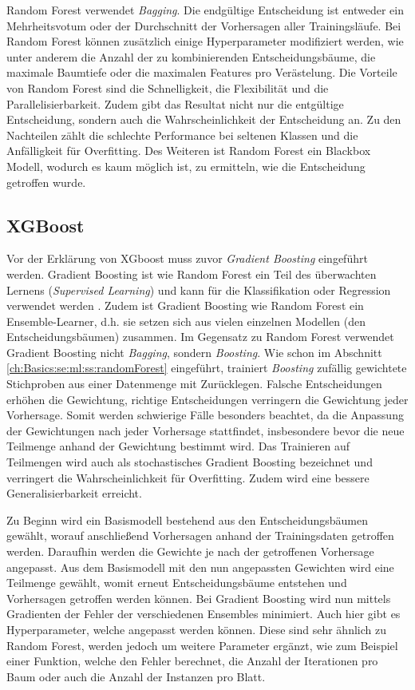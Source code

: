 Random Forest verwendet \textit{Bagging}. 
Die endgültige Entscheidung ist entweder ein Mehrheitsvotum oder der Durchschnitt der Vorhersagen aller Trainingsläufe.
Bei Random Forest können zusätzlich einige Hyperparameter modifiziert werden, wie unter anderem die Anzahl der zu kombinierenden Entscheidungsbäume, die maximale Baumtiefe oder die maximalen Features pro Verästelung. 
Die Vorteile von Random Forest sind die Schnelligkeit, die Flexibilität und die Parallelisierbarkeit.
Zudem gibt das Resultat nicht nur die entgültige Entscheidung, sondern auch die Wahrscheinlichkeit der Entscheidung an.
Zu den Nachteilen zählt die schlechte Performance bei seltenen Klassen und die Anfälligkeit für Overfitting.
Des Weiteren ist Random Forest ein Blackbox Modell, wodurch es kaum möglich ist, zu ermitteln, wie die Entscheidung getroffen wurde.

\subsection{XGBoost}
\label{ch:Basics:se:ml:ss:xgboost}
Vor der Erklärung von XGboost muss zuvor \textit{Gradient Boosting} eingeführt werden.
Gradient Boosting ist wie Random Forest ein Teil des überwachten Lernens (\textit{Supervised Learning}) und kann für die Klassifikation oder Regression verwendet werden \cite{friedmannStochasticGradientBoosting1999}. 
Zudem ist Gradient Boosting wie Random Forest ein Ensemble-Learner, d.h. sie setzen sich aus vielen einzelnen Modellen (den Entscheidungsbäumen) zusammen.
Im Gegensatz zu Random Forest verwendet Gradient Boosting nicht \textit{Bagging}, sondern \textit{Boosting}.
Wie schon im Abschnitt \ref{ch:Basics:se:ml:ss:randomForest} eingeführt, trainiert \textit{Boosting} zufällig gewichtete Stichproben aus einer Datenmenge mit Zurücklegen. 
Falsche Entscheidungen erhöhen die Gewichtung, richtige Entscheidungen verringern die Gewichtung jeder Vorhersage. 
Somit werden schwierige Fälle besonders beachtet, da die Anpassung der Gewichtungen nach jeder Vorhersage stattfindet, insbesondere bevor die neue Teilmenge anhand der Gewichtung bestimmt wird.
Das Trainieren auf Teilmengen wird auch als stochastisches Gradient Boosting bezeichnet und verringert die Wahrscheinlichkeit für Overfitting.
Zudem wird eine bessere Generalisierbarkeit erreicht.

Zu Beginn wird ein Basismodell bestehend aus den Entscheidungsbäumen gewählt, worauf anschließend Vorhersagen anhand der Trainingsdaten getroffen werden.
Daraufhin werden die Gewichte je nach der getroffenen Vorhersage angepasst.
Aus dem Basismodell mit den nun angepassten Gewichten wird eine Teilmenge gewählt, womit erneut Entscheidungsbäume entstehen und Vorhersagen getroffen werden können.
Bei Gradient Boosting wird nun mittels Gradienten der Fehler der verschiedenen Ensembles minimiert.
Auch hier gibt es Hyperparameter, welche angepasst werden können. 
Diese sind sehr ähnlich zu Random Forest, werden jedoch um weitere Parameter ergänzt, wie zum Beispiel einer Funktion, welche den Fehler berechnet, die Anzahl der Iterationen pro Baum oder auch die Anzahl der Instanzen pro Blatt.

